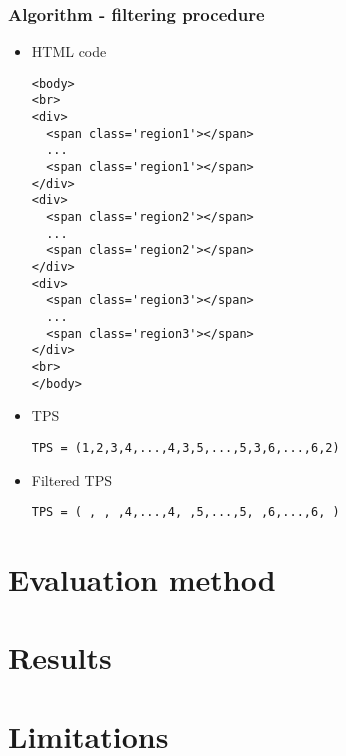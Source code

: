 \documentclass{beamer}
\begin{document}

\begin{frame}[fragile]
\frametitle{Algorithm - filtering procedure}
\fontsize{8}{7.2}\selectfont
\begin{itemize}
\item{HTML code} 
\begin{verbatim}
<body>
<br>
<div>
  <span class='region1'></span>
  ...
  <span class='region1'></span>
</div> 
<div>
  <span class='region2'></span>
  ...
  <span class='region2'></span>
</div>
<div>
  <span class='region3'></span>
  ...
  <span class='region3'></span>
</div>
<br>
</body>
\end{verbatim}
\item{TPS}
\begin{verbatim}
TPS = (1,2,3,4,...,4,3,5,...,5,3,6,...,6,2)
\end{verbatim}
\item{Filtered TPS}
\begin{verbatim}
TPS = ( , , ,4,...,4, ,5,...,5, ,6,...,6, )
\end{verbatim}
\end{itemize}
\end{frame}

\section{Evaluation method} 

\section{Results} 

\section{Limitations} 
\end{document}
